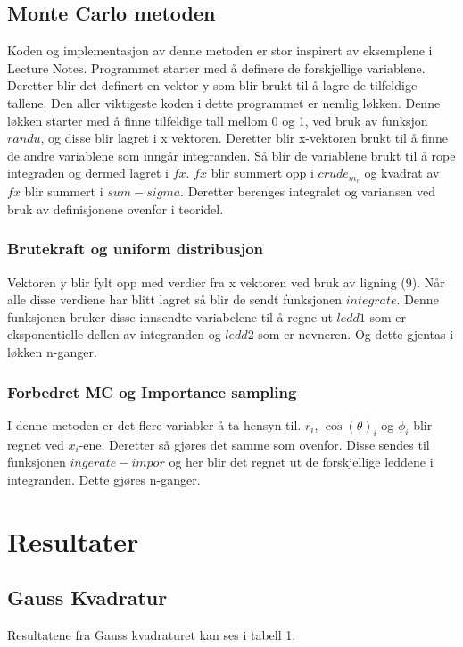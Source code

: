 \documentclass[%
oneside,                 %
final,                   %
10pt]{article}
\begin{document}
\subsection{Monte Carlo metoden}
\noindent Koden og implementasjon av denne metoden er stor inspirert av eksemplene i Lecture Notes. Programmet starter med å definere de forskjellige variablene. Deretter blir det definert en vektor y som blir brukt til å lagre de tilfeldige tallene. Den aller viktigeste koden i dette programmet er nemlig løkken. Denne løkken starter med å finne tilfeldige tall mellom 0 og 1, ved bruk av funksjon $randu$, og disse blir lagret i x vektoren. Deretter blir x-vektoren brukt til å finne de andre variablene som inngår integranden. Så blir de variablene brukt til å rope integraden og dermed lagret i $fx$. $fx$ blir summert opp i $crude_m_c$ og kvadrat av $fx$ blir summert i $sum-sigma$. Deretter berenges integralet og variansen ved bruk av definisjonene ovenfor i teoridel.

\subsubsection{Brutekraft og uniform distribusjon}
\noindent Vektoren y blir fylt opp med verdier fra x vektoren ved bruk av ligning (9). Når alle disse verdiene har blitt lagret så blir de sendt funksjonen $integrate$. Denne funksjonen bruker disse innsendte variabelene til å regne ut $ledd1$ som er eksponentielle dellen av integranden og $ledd2$ som er nevneren. Og dette gjentas i løkken n-ganger.

\subsubsection{Forbedret MC og Importance sampling}
\noindent I denne metoden er det flere variabler å ta hensyn til.
$r_i$, $\cos(\theta)_i$ og $\phi_i$ blir regnet ved $x_i$-ene. Deretter så gjøres det samme som ovenfor. Disse sendes til funksjonen $ingerate-impor$ og her blir det regnet ut de forskjellige leddene i integranden. Dette gjøres n-ganger.

\section{Resultater}
\subsection{Gauss Kvadratur}
\noindent Resultatene fra Gauss kvadraturet kan ses i tabell 1.
\end{document}
